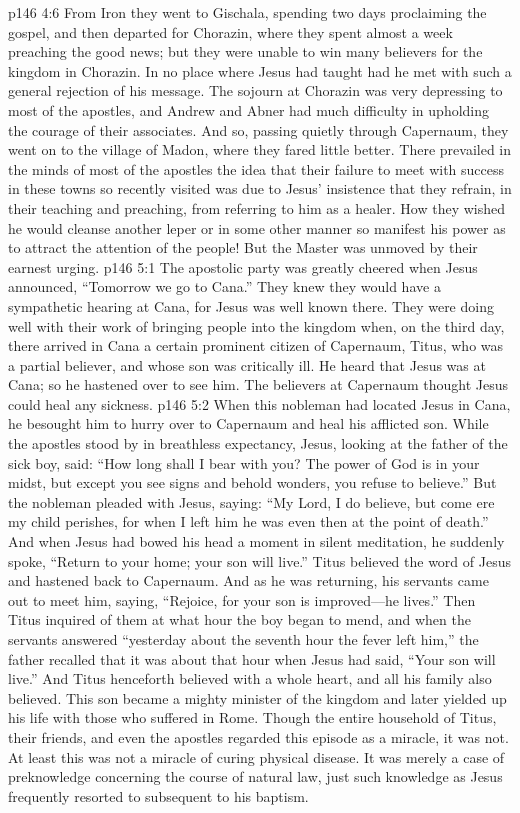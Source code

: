 \pc \vs p146 4:6 From Iron they went to Gischala, spending two days proclaiming the gospel, and then departed for Chorazin, where they spent almost a week preaching the good news; but they were unable to win many believers for the kingdom in Chorazin. In no place where Jesus had taught had he met with such a general rejection of his message. The sojourn at Chorazin was very depressing to most of the apostles, and Andrew and Abner had much difficulty in upholding the courage of their associates. And so, passing quietly through Capernaum, they went on to the village of Madon, where they fared little better. There prevailed in the minds of most of the apostles the idea that their failure to meet with success in these towns so recently visited was due to Jesus’ insistence that they refrain, in their teaching and preaching, from referring to him as a healer. How they wished he would cleanse another leper or in some other manner so manifest his power as to attract the attention of the people! But the Master was unmoved by their earnest urging.
\vs p146 5:1 The apostolic party was greatly cheered when Jesus announced, \textcolor{ubdarkred}{“Tomorrow we go to Cana.”} They knew they would have a sympathetic hearing at Cana, for Jesus was well known there. They were doing well with their work of bringing people into the kingdom when, on the third day, there arrived in Cana a certain prominent citizen of Capernaum, Titus, who was a partial believer, and whose son was critically ill. He heard that Jesus was at Cana; so he hastened over to see him. The believers at Capernaum thought Jesus could heal any sickness.
\vs p146 5:2 When this nobleman had located Jesus in Cana, he besought him to hurry over to Capernaum and heal his afflicted son. While the apostles stood by in breathless expectancy, Jesus, looking at the father of the sick boy, said: \textcolor{ubdarkred}{“How long shall I bear with you? The power of God is in your midst, but except you see signs and behold wonders, you refuse to believe.”} But the nobleman pleaded with Jesus, saying: “My Lord, I do believe, but come ere my child perishes, for when I left him he was even then at the point of death.” And when Jesus had bowed his head a moment in silent meditation, he suddenly spoke, \textcolor{ubdarkred}{“Return to your home; your son will live.”} Titus believed the word of Jesus and hastened back to Capernaum. And as he was returning, his servants came out to meet him, saying, “Rejoice, for your son is improved---he lives.” Then Titus inquired of them at what hour the boy began to mend, and when the servants answered “yesterday about the seventh hour the fever left him,” the father recalled that it was about that hour when Jesus had said, “Your son will live.” And Titus henceforth believed with a whole heart, and all his family also believed. This son became a mighty minister of the kingdom and later yielded up his life with those who suffered in Rome. Though the entire household of Titus, their friends, and even the apostles regarded this episode as a miracle, it was not. At least this was not a miracle of curing physical disease. It was merely a case of preknowledge concerning the course of natural law, just such knowledge as Jesus frequently resorted to subsequent to his baptism.
